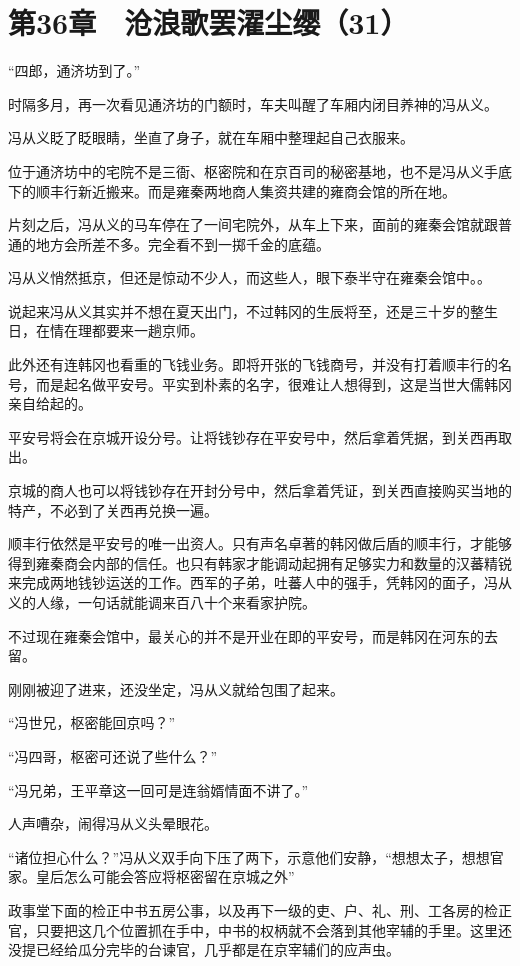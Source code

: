 \section{第36章　沧浪歌罢濯尘缨（31）}

“四郎，通济坊到了。”

时隔多月，再一次看见通济坊的门额时，车夫叫醒了车厢内闭目养神的冯从义。

冯从义眨了眨眼睛，坐直了身子，就在车厢中整理起自己衣服来。

位于通济坊中的宅院不是三衙、枢密院和在京百司的秘密基地，也不是冯从义手底下的顺丰行新近搬来。而是雍秦两地商人集资共建的雍商会馆的所在地。

片刻之后，冯从义的马车停在了一间宅院外，从车上下来，面前的雍秦会馆就跟普通的地方会所差不多。完全看不到一掷千金的底蕴。

冯从义悄然抵京，但还是惊动不少人，而这些人，眼下泰半守在雍秦会馆中。。

说起来冯从义其实并不想在夏天出门，不过韩冈的生辰将至，还是三十岁的整生日，在情在理都要来一趟京师。

此外还有连韩冈也看重的飞钱业务。即将开张的飞钱商号，并没有打着顺丰行的名号，而是起名做平安号。平实到朴素的名字，很难让人想得到，这是当世大儒韩冈亲自给起的。

平安号将会在京城开设分号。让将钱钞存在平安号中，然后拿着凭据，到关西再取出。

京城的商人也可以将钱钞存在开封分号中，然后拿着凭证，到关西直接购买当地的特产，不必到了关西再兑换一遍。

顺丰行依然是平安号的唯一出资人。只有声名卓著的韩冈做后盾的顺丰行，才能够得到雍秦商会内部的信任。也只有韩家才能调动起拥有足够实力和数量的汉蕃精锐来完成两地钱钞运送的工作。西军的子弟，吐蕃人中的强手，凭韩冈的面子，冯从义的人缘，一句话就能调来百八十个来看家护院。

不过现在雍秦会馆中，最关心的并不是开业在即的平安号，而是韩冈在河东的去留。

刚刚被迎了进来，还没坐定，冯从义就给包围了起来。

“冯世兄，枢密能回京吗？”

“冯四哥，枢密可还说了些什么？”

“冯兄弟，王平章这一回可是连翁婿情面不讲了。”

人声嘈杂，闹得冯从义头晕眼花。

“诸位担心什么？”冯从义双手向下压了两下，示意他们安静，“想想太子，想想官家。皇后怎么可能会答应将枢密留在京城之外”

政事堂下面的检正中书五房公事，以及再下一级的吏、户、礼、刑、工各房的检正官，只要把这几个位置抓在手中，中书的权柄就不会落到其他宰辅的手里。这里还没提已经给瓜分完毕的台谏官，几乎都是在京宰辅们的应声虫。

